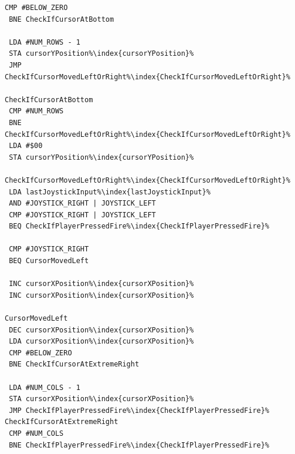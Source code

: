 \begin{minipage}[b]{0.33\linewidth}
\begin{lrbox}{\mybox}
\begin{lstlisting}[basicstyle=\ttfamily\tiny,escapechar=\%]
 CMP #BELOW_ZERO
 BNE CheckIfCursorAtBottom

 LDA #NUM_ROWS - 1
 STA cursorYPosition%\index{cursorYPosition}%
 JMP CheckIfCursorMovedLeftOrRight%\index{CheckIfCursorMovedLeftOrRight}%

CheckIfCursorAtBottom
 CMP #NUM_ROWS
 BNE CheckIfCursorMovedLeftOrRight%\index{CheckIfCursorMovedLeftOrRight}%
 LDA #$00
 STA cursorYPosition%\index{cursorYPosition}%

CheckIfCursorMovedLeftOrRight%\index{CheckIfCursorMovedLeftOrRight}%
 LDA lastJoystickInput%\index{lastJoystickInput}%
 AND #JOYSTICK_RIGHT | JOYSTICK_LEFT
 CMP #JOYSTICK_RIGHT | JOYSTICK_LEFT
 BEQ CheckIfPlayerPressedFire%\index{CheckIfPlayerPressedFire}%

 CMP #JOYSTICK_RIGHT
 BEQ CursorMovedLeft

 INC cursorXPosition%\index{cursorXPosition}%
 INC cursorXPosition%\index{cursorXPosition}%

CursorMovedLeft
 DEC cursorXPosition%\index{cursorXPosition}%
 LDA cursorXPosition%\index{cursorXPosition}%
 CMP #BELOW_ZERO
 BNE CheckIfCursorAtExtremeRight

 LDA #NUM_COLS - 1
 STA cursorXPosition%\index{cursorXPosition}%
 JMP CheckIfPlayerPressedFire%\index{CheckIfPlayerPressedFire}%
CheckIfCursorAtExtremeRight
 CMP #NUM_COLS
 BNE CheckIfPlayerPressedFire%\index{CheckIfPlayerPressedFire}%
\end{lstlisting}
\end{lrbox}%
\scalebox{0.8}{\usebox{\mybox}}
\end{minipage}
